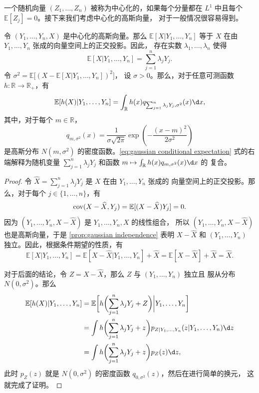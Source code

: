 一个随机向量 $(Z_1,\dots,Z_n)$ 被称为中心化的，如果每个分量都在 $L^1$
中且每个 $\mathbb{E}[Z_j]=0$。接下来我们考虑中心化的高斯向量，
对于一般情况很容易得到。

\begin{theorem}
  令 $(Y_1,\dots,Y_n,X)$ 是中心化的高斯向量。那么 $\mathbb{E}[X|Y_1,\dots,Y_n]$
  等于 $X$ 在由 $Y_1,\dots,Y_n$ 张成的向量空间上的正交投影。因此，
  存在实数 $\lambda_1,\dots,\lambda_n$ 使得
  \[
    \mathbb{E}[X|Y_1,\dots,Y_n]=
    \sum_{j=1}^n \lambda_j Y_j.
  \]
  令 $\sigma^2=\mathbb{E}\bigl[(X-\mathbb{E}[X|Y_1,\dots,Y_n])^2\bigr]$，
  设 $\sigma>0$。那么，对于任意可测函数 $h:\mathbb{R}\to \mathbb{R}_+$，有
  \begin{equation}\label{eq:gaussian conditional expectation}
    \mathbb{E}[h(X)|Y_1,\dots,Y_n]=\int_{\mathbb{R}}
    h(x)q_{\sum_{j=1}^n\lambda_j Y_j,\sigma^2}(x)\d x,
  \end{equation}
  其中，对于每个 $m\in \mathbb{R}$，
  \[
    q_{m,\sigma^2}(x)=\frac{1}{\sigma\sqrt{2\pi}}\exp\left(
      -\frac{(x-m)^2}{2\sigma^2}
    \right)
  \]
  是高斯分布 $N(m,\sigma^2)$ 的密度函数。\eqref{eq:gaussian conditional expectation}
  式的右端解释为随机变量 $\sum_{j=1}^n\lambda_jY_j$ 和函数 $m\mapsto \int_{\mathbb{R}}h(x)q_{m,\sigma^2}(x)\d x$ 的
  复合。
\end{theorem}
\begin{proof}
  令 $\widehat X=\sum_{j=1}^n\lambda_jY_j$ 是 $X$ 在由 $Y_1,\dots,Y_n$ 张成的
  向量空间上的正交投影。那么，对于每个 $j\in\{1,\dots,n\}$，有
  \[
    \operatorname{cov}(X-\widehat X,Y_j)=\mathbb{E}[(X-\widehat X)Y_j]=0.
  \]
  因为 $(Y_1,\dots,Y_n,X-\widehat X)$ 是 $Y_1,\dots,Y_n,X$ 的线性组合，
  所以 $(Y_1,\dots,Y_n,X-\widehat X)$ 也是高斯向量，于是 \autoref{prop:gaussian independence}
  表明 $X-\widehat X$ 和 $(Y_1,\dots,Y_n)$ 独立。因此，根据条件期望的性质，有
  \[
    \mathbb{E}[X|Y_1,\dots,Y_n]=\mathbb{E}[X-\widehat X|Y_1,\dots,Y_n]+\widehat X
    =\mathbb{E}[X-\widehat X]+\widehat X=\widehat X.
  \]

  对于后面的结论，令 $Z=X-\widehat X$，那么 $Z$ 与  $(Y_1,\dots,Y_n)$ 独立且
  服从分布 $N(0,\sigma^2)$。那么
  \begin{align*}
    \mathbb{E}[h(X)|Y_1,\dots,Y_n]&=\mathbb{E}\biggl[
      h\biggl(
        \sum_{j=1}^n \lambda_j Y_j +Z
      \biggr)\bigg| Y_1,\dots,Y_n 
    \biggr]\\
    &=\int h\biggl(
        \sum_{j=1}^n \lambda_j Y_j +z
      \biggr)p_{Z|Y_1,\dots,Y_n}(z|Y_1,\dots,Y_n)\d z\\
    &=\int h\biggl(
        \sum_{j=1}^n \lambda_j Y_j +z
      \biggr)p_{Z}(z)\d z,
  \end{align*}
  此时 $p_Z(z)$ 就是 $N(0,\sigma^2)$ 的密度函数 $q_{0,\sigma^2}(z)$，然后在进行简单的换元，
  这就完成了证明。
\end{proof}



